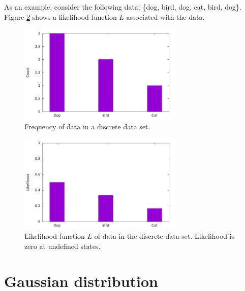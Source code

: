 \documentclass[thesis=B,english]{FITthesis}[2012/06/26]
\begin{document}
As an example, consider the following data: \{dog, bird, dog, cat, bird, dog\}. Figure \ref{fig:discrete_mle_prob} shows a likelihood function $L$ associated with the data.

\begin{figure}
	\centering
 	\includegraphics[width=0.7\textwidth]{discrete_mle_hist}
 	\caption{Frequency of data in a discrete data set.}
 	\label{fig:discrete_mle_hist}
\end{figure}

\begin{figure}
	\centering
 	\includegraphics[width=0.7\textwidth]{discrete_mle_prob}
 	\caption{Likelihood function $L$ of data in the discrete data set. Likelihood is zero at undefined states.}
 	\label{fig:discrete_mle_prob}
\end{figure}

\section{Gaussian distribution}
\end{document}
